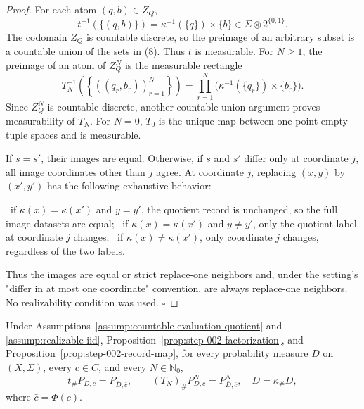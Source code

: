 \begin{proof}
For each atom \((q,b)\in Z_Q\),
\[
t^{-1}(\{(q,b)\})=\kappa^{-1}(\{q\})\times\{b\}
\in\Sigma\otimes2^{\{0,1\}}.
\tag{8}
\]
The codomain \(Z_Q\) is countable discrete, so the preimage of an arbitrary
subset is a countable union of the sets in (8). Thus \(t\) is measurable.
For \(N\ge1\), the preimage of an atom of \(Z_Q^N\) is the measurable
rectangle
\[
T_N^{-1}\!\left(
 \left\{((q_r,b_r))_{r=1}^N\right\}
\right)
=\prod_{r=1}^N
  \bigl(\kappa^{-1}(\{q_r\})\times\{b_r\}\bigr).
\tag{9}
\]
Since \(Z_Q^N\) is countable discrete, another countable-union argument
proves measurability of \(T_N\). For \(N=0\), \(T_0\) is the unique map
between one-point empty-tuple spaces and is measurable.

If \(s=s'\), their images are equal. Otherwise, if \(s\) and \(s'\) differ
only at coordinate \(j\), all image coordinates
other than \(j\) agree. At coordinate \(j\), replacing \((x,y)\) by
\((x',y')\) has the following exhaustive behavior:

\noindent \ if \(\kappa(x)=\kappa(x')\) and \(y=y'\), the quotient record is unchanged,
  so the full image datasets are equal;
\noindent \ if \(\kappa(x)=\kappa(x')\) and \(y\ne y'\), only the quotient label at
  coordinate \(j\) changes;
\noindent \ if \(\kappa(x)\ne\kappa(x')\), only coordinate \(j\) changes, regardless of
  the two labels.

Thus the images are equal or strict replace-one neighbors and, under the
setting's "differ in at most one coordinate" convention, are always
replace-one neighbors. No realizability condition was used. \(\square\)


\end{proof}

\begin{proposition}\label{prop:step-002-iid-pushforward}
Under Assumptions~\ref{assump:countable-evaluation-quotient} and
\ref{assump:realizable-iid}, Proposition~\ref{prop:step-002-factorization},
and Proposition~\ref{prop:step-002-record-map}, for every probability measure
\(D\) on \((X,\Sigma)\), every \(c\in C\), and every
\(N\in\mathbb N_0\),
\[
t_\#P_{D,c}=P_{\bar D,\bar c},
\qquad
(T_N)_\#P_{D,c}^N=P_{\bar D,\bar c}^N,
\quad \bar D=\kappa_\#D,
\tag{10}
\]
where \(\bar c=\Phi(c)\).


\end{proposition}

